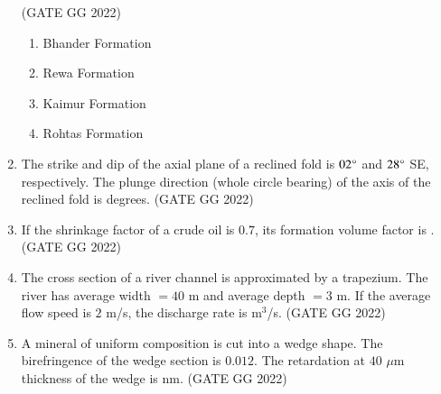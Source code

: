 \documentclass[journal]{IEEEtran}
\begin{document}
\begin{enumerate}[start=1]
\hfill(GATE GG 2022)
\begin{enumerate}
\item Bhander Formation
\item Rewa Formation
\item Kaimur Formation
\item Rohtas Formation
\end{enumerate}
\vspace{0.5cm}

\item The strike and dip of the axial plane of a reclined fold is $02\degree$ and $28\degree$ SE, respectively. The plunge direction (whole circle bearing) of the axis of the reclined fold is\makebox[2cm]{\hrulefill} degrees. 
\hfill(GATE GG 2022)
\vspace{0.5cm}

\item If the shrinkage factor of a crude oil is $0.7$, its formation volume factor is \makebox[2cm]{\hrulefill}. 
\hfill(GATE GG 2022)
\vspace{0.5cm}

\item The cross section of a river channel is approximated by a trapezium. The river has  average width $= 40$ m and average depth $= 3$ m. If the average flow speed is $2$ m/s,  the discharge rate is \makebox[2cm]{\hrulefill} m$^3$/s. 
\hfill(GATE GG 2022)
\vspace{0.5cm}

\item A mineral of uniform composition is cut into a wedge shape.  
The birefringence of the wedge section is $0.012$. The retardation at $40$ $\mu$m thickness of the wedge is \makebox[2cm]{\hrulefill} nm. 
\hfill(GATE GG 2022)
\vspace{0.5cm}


\end{enumerate}
\end{document}
